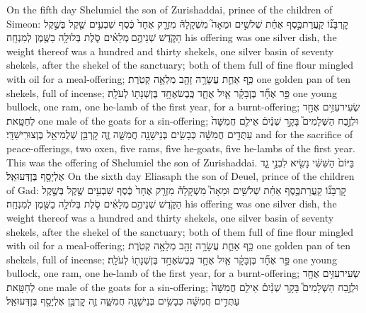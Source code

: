 \documentclass[11pt, openany]{book}
\begin{document}
{On the fifth day Shelumiel the son of Zurishaddai, prince of the children of Simeon:}
{קׇרְבָּנ֞וֹ קַֽעֲרַת\maqqaf כֶּ֣סֶף אַחַ֗ת שְׁלֹשִׁ֣ים וּמֵאָה֮ מִשְׁקָלָהּ֒ מִזְרָ֤ק אֶחָד֙ כֶּ֔סֶף שִׁבְעִ֥ים שֶׁ֖קֶל בְּשֶׁ֣קֶל הַקֹּ֑דֶשׁ שְׁנֵיהֶ֣ם \legarmeh  מְלֵאִ֗ים סֹ֛לֶת בְּלוּלָ֥ה בַשֶּׁ֖מֶן לְמִנְחָֽה׃}
{his offering was one silver dish, the weight thereof was a hundred and thirty shekels, one silver basin of seventy shekels, after the shekel of the sanctuary; both of them full of fine flour mingled with oil for a meal-offering;}
{כַּ֥ף אַחַ֛ת עֲשָׂרָ֥ה זָהָ֖ב מְלֵאָ֥ה קְטֹֽרֶת׃}
{one golden pan of ten shekels, full of incense;}
{פַּ֣ר אֶחָ֞ד בֶּן\maqqaf בָּקָ֗ר אַ֧יִל אֶחָ֛ד כֶּֽבֶשׂ\maqqaf אֶחָ֥ד בֶּן\maqqaf שְׁנָת֖וֹ לְעֹלָֽה׃}
{one young bullock, one ram, one he-lamb of the first year, for a burnt-offering;}
{שְׂעִיר\maqqaf עִזִּ֥ים אֶחָ֖ד לְחַטָּֽאת׃}
{one male of the goats for a sin-offering;}
{וּלְזֶ֣בַח הַשְּׁלָמִים֮ בָּקָ֣ר שְׁנַ֒יִם֒ אֵילִ֤ם חֲמִשָּׁה֙ עַתֻּדִ֣ים חֲמִשָּׁ֔ה כְּבָשִׂ֥ים בְּנֵי\maqqaf שָׁנָ֖ה חֲמִשָּׁ֑ה זֶ֛ה קׇרְבַּ֥ן שְׁלֻמִיאֵ֖ל בֶּן\maqqaf צוּרִֽישַׁדָּֽי׃ \petucha }
{and for the sacrifice of peace-offerings, two oxen, five rams, five he-goats, five he-lambs of the first year. This was the offering of Shelumiel the son of Zurishaddai.}
{בַּיּוֹם֙ הַשִּׁשִּׁ֔י נָשִׂ֖יא לִבְנֵ֣י גָ֑ד אֶלְיָסָ֖ף בֶּן\maqqaf דְּעוּאֵֽל׃}
{On the sixth day Eliasaph the son of Deuel, prince of the children of Gad:}
{קׇרְבָּנ֞וֹ קַֽעֲרַת\maqqaf כֶּ֣סֶף אַחַ֗ת שְׁלֹשִׁ֣ים וּמֵאָה֮ מִשְׁקָלָהּ֒ מִזְרָ֤ק אֶחָד֙ כֶּ֔סֶף שִׁבְעִ֥ים שֶׁ֖קֶל בְּשֶׁ֣קֶל הַקֹּ֑דֶשׁ שְׁנֵיהֶ֣ם \legarmeh  מְלֵאִ֗ים סֹ֛לֶת בְּלוּלָ֥ה בַשֶּׁ֖מֶן לְמִנְחָֽה׃}
{his offering was one silver dish, the weight thereof was a hundred and thirty shekels, one silver basin of seventy shekels, after the shekel of the sanctuary; both of them full of fine flour mingled with oil for a meal-offering;}
{כַּ֥ף אַחַ֛ת עֲשָׂרָ֥ה זָהָ֖ב מְלֵאָ֥ה קְטֹֽרֶת׃}
{one golden pan of ten shekels, full of incense;}
{פַּ֣ר אֶחָ֞ד בֶּן\maqqaf בָּקָ֗ר אַ֧יִל אֶחָ֛ד כֶּֽבֶשׂ\maqqaf אֶחָ֥ד בֶּן\maqqaf שְׁנָת֖וֹ לְעֹלָֽה׃}
{one young bullock, one ram, one he-lamb of the first year, for a burnt-offering;}
{שְׂעִיר\maqqaf עִזִּ֥ים אֶחָ֖ד לְחַטָּֽאת׃}
{one male of the goats for a sin-offering;}
{וּלְזֶ֣בַח הַשְּׁלָמִים֮ בָּקָ֣ר שְׁנַ֒יִם֒ אֵילִ֤ם חֲמִשָּׁה֙ עַתֻּדִ֣ים חֲמִשָּׁ֔ה כְּבָשִׂ֥ים בְּנֵי\maqqaf שָׁנָ֖ה חֲמִשָּׁ֑ה זֶ֛ה קׇרְבַּ֥ן אֶלְיָסָ֖ף בֶּן\maqqaf דְּעוּאֵֽל׃ \petucha }
\end{document}
